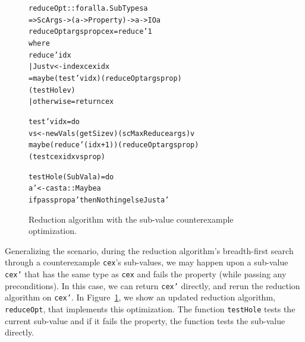 \documentclass{sigplanconf}
\newenvironment{code}{\begin{alltt}}{\end{alltt}}
\newcommand{\ttp}[1]{\texttt{#1}}
\begin{document}





\begin{figure}
\begin{code}
reduceOpt :: forall a . SubTypes a
  => ScArgs -> (a -> Property) -> a -> IO a
reduceOpt args prop cex = reduce' 1
  where
  reduce' idx
    | Just v <- index cex idx
    = maybe (test' v idx) (reduceOpt args prop)
            (testHole v)
    | otherwise = return cex

  test' v idx = do
    vs <- newVals (getSize v) (scMaxReduce args) v
    maybe (reduce' (idx+1)) (reduceOpt args prop)
          (test cex idx vs prop)

  testHole (SubVal a) = do
    a' <- cast a :: Maybe a
    if pass prop a' then Nothing else Just a'
\end{code}
  \caption{Reduction algorithm with the sub-value counterexample optimization.}
  \label{fig:reduce0}
\end{figure}

Generalizing the scenario, during the reduction algorithm's breadth-first
search through a counterexample \ttp{cex}'s sub-values, we may happen upon a
sub-value \ttp{cex'} that has the same type as \ttp{cex} and fails the property
(while passing any preconditions).  In this case, we can return \ttp{cex'}
directly, and rerun the reduction algorithm on \ttp{cex'}.  In
Figure~\ref{fig:reduce0}, we show an updated reduction algorithm, \ttp{reduceOpt},
that implements this optimization.  The function \ttp{testHole} tests the
current sub-value and if it fails the property, the function tests the sub-value
directly.
\end{document}
